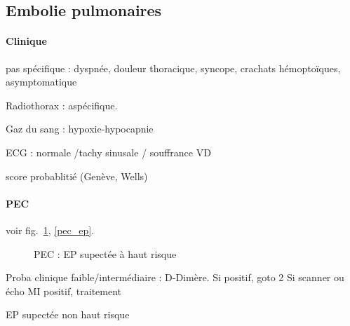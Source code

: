 \documentclass{article}
\begin{document}
\subsection{Embolie pulmonaires}

\paragraph{Clinique} pas spécifique : dyspnée, douleur thoracique, syncope,
crachats hémoptoïques, asymptomatique

Radiothorax : aspécifique. 

Gaz du sang : hypoxie-hypocapnie

ECG : normale /tachy sinusale / souffrance VD

\thus score probablitié (Genève, Wells)

\paragraph{PEC} voir fig.~\ref{fig:pec_ep_risque}, \ref{pec_ep}.
\begin{figure}[htpb]                    
  \centering                              
  \caption{PEC : EP supectée à haut risque}
  \label{fig:pec_ep_risque}  
\end{figure}                            

\begin{algorithm}
  Proba clinique faible/intermédiaire : D-Dimère. Si positif, goto 2\;
  Si scanner ou écho MI positif, traitement\;
  \caption{EP supectée non haut risque}
  \label{fig:pec_ep}
\end{algorithm}
\end{document}
